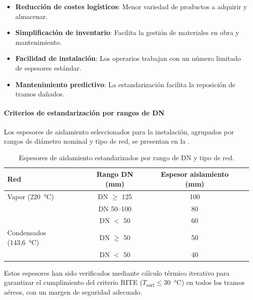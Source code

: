 \begin{itemize}[noitemsep]
	\item \textbf{Reducción de costes logísticos}: Menor variedad de productos a adquirir y almacenar.
	\item \textbf{Simplificación de inventario}: Facilita la gestión de materiales en obra y mantenimiento.
	\item \textbf{Facilidad de instalación}: Los operarios trabajan con un número limitado de espesores estándar.
	\item \textbf{Mantenimiento predictivo}: La estandarización facilita la reposición de tramos dañados.
\end{itemize}

\paragraph{Criterios de estandarización por rangos de DN}
\label{par:rangos_estandarizados}

Los espesores de aislamiento seleccionados para la instalación, agrupados por rangos de diámetro nominal y tipo de red, se presentan en la .

\begin{table}[htbp]
	\centering
	\caption{Espesores de aislamiento estandarizados por rango de DN y tipo de red.}
	\label{tab:rangos_estandarizados}
	\begin{tabular}{lccc}
		\toprule
		\textbf{Red}             & \textbf{Rango DN (mm)} & \textbf{Espesor aislamiento (mm)} \\
		\midrule
		Vapor (220~°C)           & DN $\geq$ 125          & 100                               \\
		                         & DN 50--100             & 80                                \\
		                         & DN $<$ 50              & 60                                \\
		\midrule
		Condensados (143{,}6~°C) & DN $\geq$ 50           & 50                                \\
		                         & DN $<$ 50              & 40                                \\
		\bottomrule
	\end{tabular}
\end{table}

Estos espesores han sido verificados mediante cálculo térmico iterativo para garantizar el cumplimiento del criterio RITE ($T_{\text{surf}} \leq 30$~°C) en todos los tramos aéreos, con un margen de seguridad adecuado.

